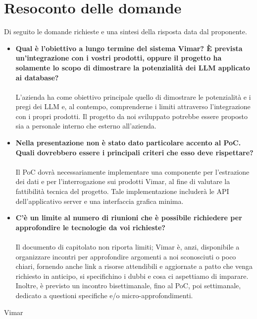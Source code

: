 \section{Resoconto delle domande}
Di seguito le domande richieste e una sintesi della risposta data dal proponente.\\
\begin{itemize}
    \item \textbf{Qual è l’obiettivo a lungo termine del sistema Vimar? È prevista un’integrazione con i vostri prodotti, oppure il progetto ha solamente lo scopo di dimostrare la potenzialità dei LLM applicato ai database?}\\\\
    L'azienda ha come obiettivo principale quello di dimostrare le potenzialità e i pregi dei LLM e, al contempo, comprenderne i limiti attraverso l'integrazione con i propri prodotti. Il progetto da noi sviluppato potrebbe essere proposto sia a personale interno che esterno all'azienda.\\
    
    \item \textbf{Nella presentazione non è stato dato particolare accento al PoC. Quali dovrebbero essere i principali criteri che esso deve rispettare?}\\\\
    Il PoC dovrà necessariamente implementare una componente per l'estrazione dei dati e per l'interrogazione sui prodotti Vimar, al fine di valutare la fattibilità tecnica del progetto. Tale implementazione includerà le API dell'applicativo server e una interfaccia grafica minima.\\
    
    \item \textbf{C'è un limite al numero di riunioni che è possibile richiedere per approfondire le tecnologie da voi richieste? }\\\\
    Il documento di capitolato non riporta limiti; Vimar è, anzi, disponibile a organizzare incontri per approfondire argomenti a noi sconosciuti o poco chiari, fornendo anche link a risorse attendibili e aggiornate a patto che venga richiesto in anticipo, si specifichino i dubbi e cosa ci aspettiamo di imparare. Inoltre, è previsto un incontro bisettimanale, fino al PoC, poi settimanale, dedicato a questioni specifiche e/o micro-approfondimenti.\\
\end{itemize}

\hfill\signature{Approvazione esterna}{Vimar}



